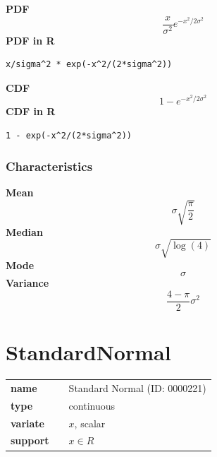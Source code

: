 \smallskip \noindent \hspace{.2cm} \textbf{PDF} 
\begin{equation*}\frac{x}{\sigma^2} e^{-x^2/2\sigma^2}\end{equation*}
\smallskip \noindent \hspace{.2cm} \textbf{PDF in R}  
\begin{verbatim}x/sigma^2 * exp(-x^2/(2*sigma^2))\end{verbatim}
\smallskip \noindent \hspace{.2cm} \textbf{CDF} 
\begin{equation*}1 - e^{-x^2/2\sigma^2}\end{equation*}
\smallskip \noindent \hspace{.2cm} \textbf{CDF in R} 
\begin{verbatim}1 - exp(-x^2/(2*sigma^2))\end{verbatim}
\smallskip
\subsubsection*{Characteristics}
\smallskip \noindent \hspace{.2cm} \textbf{Mean} 
\begin{equation*}\sigma \sqrt{\frac{\pi}{2}}\end{equation*}
\smallskip \noindent \hspace{.2cm} \textbf{Median} 
\begin{equation*}\sigma \sqrt{\log(4)}\end{equation*}
\smallskip \noindent \hspace{.2cm} \textbf{Mode} 
\begin{equation*}\sigma\end{equation*}
\smallskip \noindent \hspace{.2cm} \textbf{Variance} 
\begin{equation*}\frac{4 - \pi}{2} \sigma^2\end{equation*}
\smallskip
\section*{StandardNormal} 

  \bigskip 

\begin{tabular}{p{2cm}cl}
\textbf{name} & & Standard Normal (ID: 0000221)\\ 
 
\textbf{type} & & continuous \\ 

\textbf{variate} & & $x$, scalar \\ 

\textbf{support} & & $x \in R$
\end{tabular}

